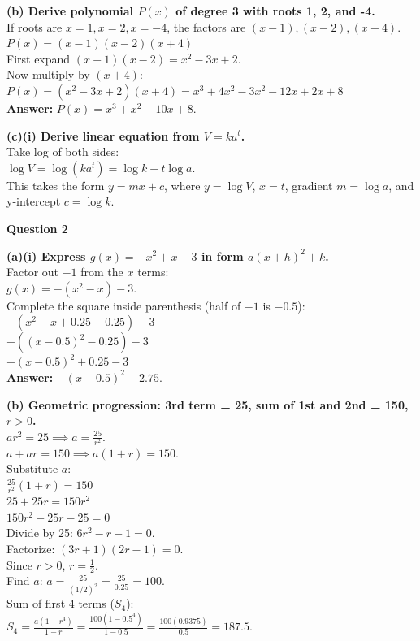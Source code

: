 \documentclass[12pt]{article}
\begin{document}
\textbf{(b) Derive polynomial $P(x)$ of degree 3 with roots 1, 2, and -4.} \\
If roots are $x=1, x=2, x=-4$, the factors are $(x-1), (x-2), (x+4)$. \\
$P(x) = (x-1)(x-2)(x+4)$ \\
First expand $(x-1)(x-2) = x^2 - 3x + 2$. \\
Now multiply by $(x+4)$: \\
$P(x) = (x^2 - 3x + 2)(x+4) = x^3 + 4x^2 - 3x^2 - 12x + 2x + 8$ \\
\textbf{Answer:} $P(x) = x^3 + x^2 - 10x + 8$.

\textbf{(c)(i) Derive linear equation from $V = ka^t$.} \\
Take log of both sides: \\
$\log V = \log(ka^t) = \log k + t \log a$. \\
This takes the form $y = mx + c$, where $y = \log V$, $x = t$, gradient $m = \log a$, and y-intercept $c = \log k$.

\textbf{Question 2}

\textbf{(a)(i) Express $g(x) = -x^2 + x - 3$ in form $a(x+h)^2 + k$.} \\
Factor out $-1$ from the $x$ terms: \\
$g(x) = -(x^2 - x) - 3$. \\
Complete the square inside parenthesis (half of $-1$ is $-0.5$): \\
$-(x^2 - x + 0.25 - 0.25) - 3$ \\
$-((x - 0.5)^2 - 0.25) - 3$ \\
$-(x - 0.5)^2 + 0.25 - 3$ \\
\textbf{Answer:} $-(x - 0.5)^2 - 2.75$.

\textbf{(b) Geometric progression: 3rd term = 25, sum of 1st and 2nd = 150, $r > 0$.} \\
$ar^2 = 25 \implies a = \frac{25}{r^2}$. \\
$a + ar = 150 \implies a(1+r) = 150$. \\
Substitute $a$: \\
$\frac{25}{r^2}(1+r) = 150$ \\
$25 + 25r = 150r^2$ \\
$150r^2 - 25r - 25 = 0$ \\
Divide by 25: $6r^2 - r - 1 = 0$. \\
Factorize: $(3r + 1)(2r - 1) = 0$. \\
Since $r > 0$, $r = \frac{1}{2}$. \\
Find $a$: $a = \frac{25}{(1/2)^2} = \frac{25}{0.25} = 100$. \\
Sum of first 4 terms ($S_4$): \\
$S_4 = \frac{a(1 - r^4)}{1 - r} = \frac{100(1 - 0.5^4)}{1 - 0.5} = \frac{100(0.9375)}{0.5} = 187.5$.
\end{document}
